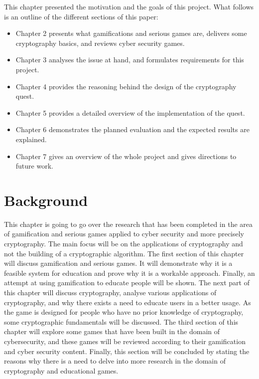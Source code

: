 \documentclass{l4proj}
\begin{document}
This chapter presented the motivation and the goals of this project.
What follows is an outline of the different sections of this paper:
\begin{itemize}
    \item Chapter 2 presents what gamifications and serious games are, delivers some cryptography basics, and reviews cyber security games.
    \item Chapter 3 analyses the issue at hand, and formulates requirements for this project.
    \item Chapter 4 provides the reasoning behind the design of the cryptography quest.
    \item Chapter 5 provides a detailed overview of the implementation of the quest.
    \item Chapter 6 demonstrates the planned evaluation and the expected results are explained.
    \item Chapter 7 gives an overview of the whole project and gives directions to future work.
\end{itemize}

\chapter{Background}

This chapter is going to go over the research that has been completed in the area of gamification and serious games applied to cyber security and more precisely cryptography.
The main focus will be on the applications of cryptography and not the building of a cryptographic algorithm.
The first section of this chapter will discuss gamification and serious games. It will demonstrate why it is a feasible system for education and prove why it is a workable approach.
Finally, an attempt at using gamification to educate people will be shown.
The next part of this chapter will discuss cryptography, analyse various applications of cryptography, and why there exists a need to educate users in a better usage.
As the game is designed for people who have no prior knowledge of cryptography, some cryptographic fundamentals will be discussed.
The third section of this chapter will explore some games that have been built in the domain of cybersecurity, and these games will be reviewed according to 
their gamification and cyber security content.
Finally, this section will be concluded by stating the reasons why there is a need to delve into more research in the domain of cryptography and educational games.
\end{document}
